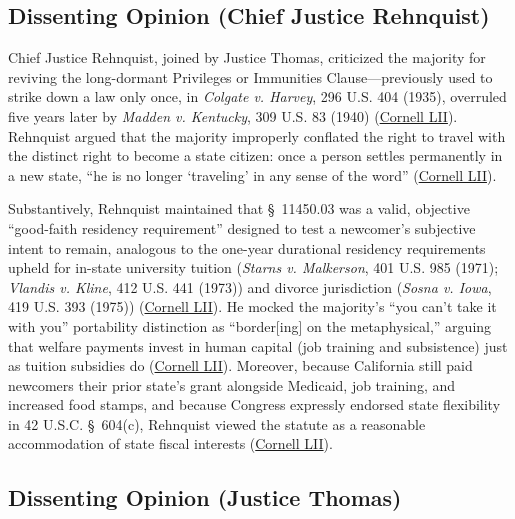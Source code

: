 \documentclass[12pt]{article}
\begin{document}
\subsection{Dissenting Opinion (Chief Justice Rehnquist)}

Chief Justice Rehnquist, joined by Justice Thomas, criticized the majority for reviving the long-dormant Privileges or Immunities Clause---previously used to strike down a law only once, in \textit{Colgate v. Harvey}, 296 U.S. 404 (1935), overruled five years later by \textit{Madden v. Kentucky}, 309 U.S. 83 (1940) (\href{https://www.law.cornell.edu/supct/html/98-97.ZD.html}{Cornell LII}). Rehnquist argued that the majority improperly conflated the right to travel with the distinct right to become a state citizen: once a person settles permanently in a new state, ``he is no longer `traveling' in any sense of the word'' (\href{https://www.law.cornell.edu/supct/html/98-97.ZD.html}{Cornell LII}).

Substantively, Rehnquist maintained that \S~11450.03 was a valid, objective ``good-faith residency requirement'' designed to test a newcomer's subjective intent to remain, analogous to the one-year durational residency requirements upheld for in-state university tuition (\textit{Starns v. Malkerson}, 401 U.S. 985 (1971); \textit{Vlandis v. Kline}, 412 U.S. 441 (1973)) and divorce jurisdiction (\textit{Sosna v. Iowa}, 419 U.S. 393 (1975)) (\href{https://www.law.cornell.edu/supct/html/98-97.ZD.html}{Cornell LII}). He mocked the majority's ``you can't take it with you'' portability distinction as ``border[ing] on the metaphysical,'' arguing that welfare payments invest in human capital (job training and subsistence) just as tuition subsidies do (\href{https://www.law.cornell.edu/supct/html/98-97.ZD.html}{Cornell LII}). Moreover, because California still paid newcomers their prior state's grant alongside Medicaid, job training, and increased food stamps, and because Congress expressly endorsed state flexibility in 42 U.S.C. \S~604(c), Rehnquist viewed the statute as a reasonable accommodation of state fiscal interests (\href{https://www.law.cornell.edu/supct/html/98-97.ZD.html}{Cornell LII}).

\subsection{Dissenting Opinion (Justice Thomas)}
\end{document}
